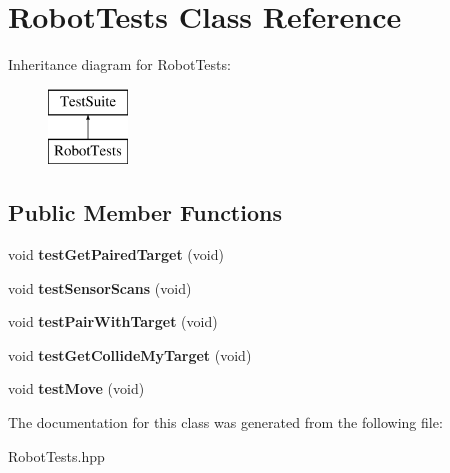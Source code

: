 \hypertarget{classRobotTests}{\section{Robot\-Tests Class Reference}
\label{classRobotTests}
}
Inheritance diagram for Robot\-Tests\-:\begin{figure}[H]
\begin{center}
\leavevmode
\includegraphics[height=2.000000cm]{classRobotTests}
\end{center}
\end{figure}
\subsection*{Public Member Functions}
\begin{DoxyCompactItemize}
\item 
\hypertarget{classRobotTests_a13488190dfd219240f08d0ec9409ff83}{void {\bfseries test\-Get\-Paired\-Target} (void)}\label{classRobotTests_a13488190dfd219240f08d0ec9409ff83}

\item 
\hypertarget{classRobotTests_a253d41ed299372c25bfef3e805cfa94f}{void {\bfseries test\-Sensor\-Scans} (void)}\label{classRobotTests_a253d41ed299372c25bfef3e805cfa94f}

\item 
\hypertarget{classRobotTests_aaa7edcf5849e5005e4b7ca247b3b2668}{void {\bfseries test\-Pair\-With\-Target} (void)}\label{classRobotTests_aaa7edcf5849e5005e4b7ca247b3b2668}

\item 
\hypertarget{classRobotTests_a9e3ef94640baa0034c0ee73b188b917f}{void {\bfseries test\-Get\-Collide\-My\-Target} (void)}\label{classRobotTests_a9e3ef94640baa0034c0ee73b188b917f}

\item 
\hypertarget{classRobotTests_a4d331c44ef8b4b5fe1d70207f68ff1ab}{void {\bfseries test\-Move} (void)}\label{classRobotTests_a4d331c44ef8b4b5fe1d70207f68ff1ab}

\end{DoxyCompactItemize}


The documentation for this class was generated from the following file\-:\begin{DoxyCompactItemize}
\item 
Robot\-Tests.\-hpp\end{DoxyCompactItemize}
